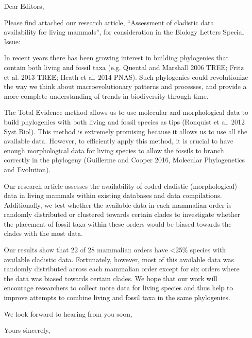 \documentclass[11pt]{letter}
\begin{document}
\begin{letter}{}
\opening{Dear Editors,}

Please find attached our research article, ``Assessment of cladistic data availability for living mammals'', for consideration in the Biology Letters Special Issue: %


In recent years there has been growing interest in building phylogenies that contain both living and fossil taxa (e.g. Quental and Marshall 2006 TREE; Fritz et al. 2013 TREE; Heath et al. 2014 PNAS).
Such phylogenies could revolutionize the way we think about macroevolutionary patterns and processes, and provide a more complete understanding of trends in biodiversity through time.

The Total Evidence method allows us to use molecular and morphological data to build phylogenies with both living and fossil species as tips (Ronquist et al. 2012 Syst Biol).
This method is extremely promising because it allows us to use all the available data. 
However, to efficiently apply this method, it is crucial to have enough morphological data for living species to allow the fossils to branch correctly in the phylogeny (Guillerme and Cooper 2016, Molecular Phylogenetics and Evolution).

Our research article assesses the availability of coded cladistic (morphological) data in living mammals within existing databases and data compilations.
Additionally, we test whether the available data in each mammalian order is randomly distributed or clustered towards certain clades to investigate whether the placement of fossil taxa within these orders would be biased towards the clades with the most data.

Our results show that 22 of 28 mammalian orders have \textless 25\% species with available cladistic data.
Fortunately, however, most of this available data was randomly distributed across each mammalian order except for six orders where the data was biased towards certain clades.
We hope that our work will encourage researchers to collect more data for living species and thus help to improve attempts to combine living and fossil taxa in the same phylogenies.

We look forward to hearing from you soon,


\closing{Yours sincerely,}


\end{letter}
\end{document}
